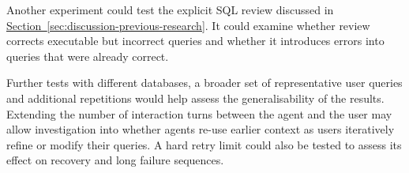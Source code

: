 Another experiment could test the explicit SQL review discussed in
\hyperref[sec:discussion-previous-research]{Section~\ref*{sec:discussion-previous-research}}.
It could examine whether review corrects executable but incorrect queries
and whether it introduces errors into queries that were already correct.

Further tests with different databases,
a broader set of representative user queries and
additional repetitions would help assess the generalisability of the results.
Extending the number of interaction turns between the agent and the user 
may allow investigation into whether agents re-use earlier context 
as users iteratively refine or modify their queries. 
A hard retry limit could also be tested to assess its effect on recovery and long failure sequences.